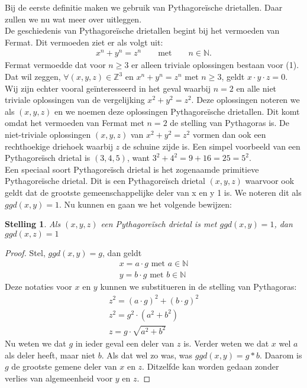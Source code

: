 \documentclass[12pt,reqno]{article}
\newcommand*{\NN}{\ensuremath{\mathbb{N}}}
\newcommand*{\ZZ}{\ensuremath{\mathbb{Z}}}
\theoremstyle{theorem}
\newtheorem{theorem}{Stelling}
\theoremstyle{definition}
\begin{document}
	
	Bij de eerste definitie maken we gebruik van Pythagore\"ische drietallen. Daar zullen we nu wat meer over uitleggen.\\
	
	De geschiedenis van Pythagore\"ische drietallen begint bij het vermoeden van Fermat. Dit vermoeden ziet er als volgt uit:
	\begin{align}
	x^n + y^n = z^n \qquad \text{met} \qquad n \in \NN.
	\end{align}
	Fermat vermoedde dat voor $n \geq 3$ er alleen triviale oplossingen bestaan voor (1). Dat wil zeggen, $\forall (x,y,z) \in \ZZ^3$ en $x^n + y^n = z^n$ met $n \geq 3$, geldt $x \cdot y \cdot z = 0$. \\
	Wij zijn echter vooral ge\"interesseerd in het geval waarbij $n=2$ en alle niet triviale oplossingen van de vergelijking $x^2 + y^2 = z^2$. Deze oplossingen noteren we als $(x,y,z)$ en we noemen deze oplossingen Pythagore\"ische drietallen. Dit komt omdat het vermoeden van Fermat met $n=2$ de stelling van Pythagoras is. De niet-triviale oplossingen $(x,y,z)$ van $x^2 + y^2 = z^2$ vormen dan ook een rechthoekige driehoek waarbij $z$ de schuine zijde is. Een simpel voorbeeld van een Pythagore\"isch drietal is $(3,4,5)$, want $3^2 + 4^2 = 9 + 16 = 25 = 5^2$. \\
	Een speciaal soort Pythagore\"isch drietal is het zogenaamde primitieve Pythagore\"ische drietal. Dit is een Pythagore\"isch drietal $(x,y,z)$ waarvoor ook geldt dat de grootste gemeenschappelijke deler van x en y 1 is. We noteren dit als $ggd(x,y) = 1$. Nu kunnen en gaan we het volgende bewijzen:
	\begin{theorem}
	Als $(x,y,z)$ een Pythagore\"isch drietal is met $ggd(x,y) = 1$, dan $ggd(x,z) = 1$
	\end{theorem}
	\begin{proof}
	Stel, $ggd(x,y) = g$, dan geldt
	\begin{align*}
	x = a \cdot g \text{ met } a \in \NN \\
	y = b \cdot g \text{ met } b \in \NN
	\end{align*}
	Deze notaties voor $x$ en $y$ kunnen we substitueren in de stelling van Pythagoras:
	\begin{align*}
	z^2=(a\cdot g)^2+(b\cdot g)^2\\
	z^2 = g^2\cdot (a^2 + b^2)\\
	z = g\cdot \sqrt{a^2 + b^2}
	\end{align*}
	Nu weten we dat $g$ in ieder geval een deler van $z$ is. Verder weten we dat $x$ wel $a$ als deler heeft, maar niet $b$. Als dat wel zo was, was $ggd(x,y) = g*b$. Daarom is $g$ de grootste gemene deler van $x$ en $z$. Ditzelfde kan worden gedaan zonder verlies van algemeenheid voor $y$ en $z$.
	\end{proof}	
\end{document}
